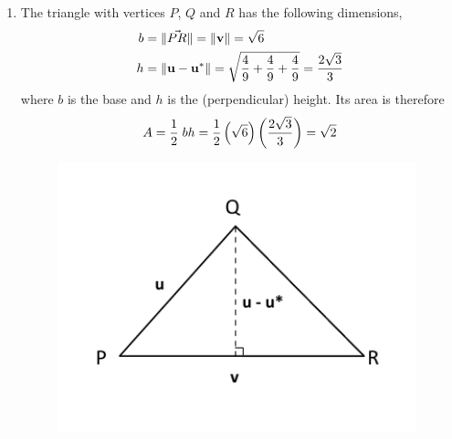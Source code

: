 \documentclass[12pt]{amsart}
\begin{document}
\begin{enumerate}
\begin{enumerate}
			\item The triangle with vertices $P$, $Q$ and $R$ has the following dimensions,
				\begin{align}
					b&=\|\vec{PR}\|=\|\mathbf{v}\|=\sqrt{6} \notag \\
					h&=\|\mathbf{u}-\mathbf{u^*}\|=\sqrt{\frac{4}{9}+\frac{4}{9}+\frac{4}{9}}=
					\frac{2\sqrt{3}}{3} \notag
				\end{align}
				where $b$ is the base and $h$ is the (perpendicular) height. Its area is therefore
				\begin{align}
					A=\frac{1}{2}\hspace{0.1cm}bh=\frac{1}{2} \left(\sqrt{6}\right) \left(\frac{2\sqrt{3}}{3}						\right)=\sqrt{2} \notag
				\end{align}
				\begin{figure}[h]
					\centering
					\includegraphics[width=4.1in]{1c.pdf}
				\end{figure}
				

\end{enumerate}
\end{enumerate}
\end{document}
